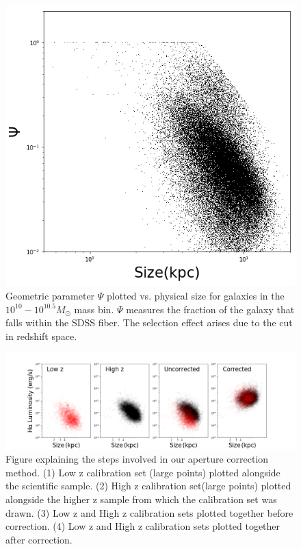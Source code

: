 \documentclass[iop]{emulateapj}
\begin{document}
\begin{figure}
	\centering
	\includegraphics[width=1 \columnwidth]{geometry_9_5.png}
	\caption{Geometric parameter $\Psi$ plotted vs. physical size for galaxies in the $10^{10} - 10^{10.5} M_{\odot}$ mass bin. $\Psi$ measures the fraction of the galaxy that falls within the SDSS fiber. The selection effect arises due to the cut in redshift space.}
     \label{fig:geo}

\end{figure}

\begin{figure}
	\centering
	\includegraphics[width=2 \columnwidth]{steps_9_5.png}
	\caption{Figure explaining the steps involved in our aperture correction method. (1) Low z calibration set (large points) plotted alongside the scientific sample. (2) High z calibration set(large points) plotted alongside the higher z sample from which the calibration set was drawn. (3) Low z and High z calibration sets plotted together before correction. (4) Low z and High z calibration sets plotted together after correction.}
     \label{fig:steps}

\end{figure}
\end{document}
